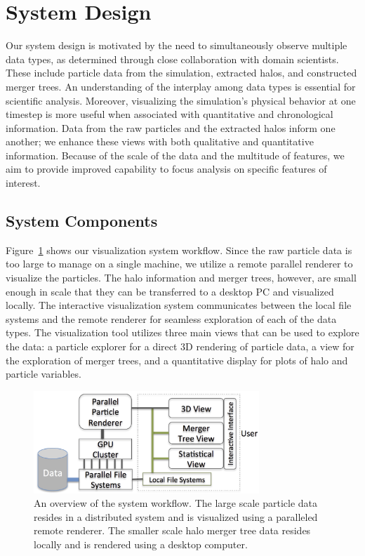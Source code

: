 \section{System Design}
 Our system design is motivated by the need to simultaneously observe multiple data types, as determined through close collaboration with domain scientists. These include particle data from the simulation, extracted halos, and constructed merger trees. An understanding of the interplay among data types is essential for scientific analysis. Moreover, visualizing the simulation's physical behavior at one timestep is more useful when associated with quantitative and chronological information. Data from the raw particles and the extracted halos inform one another; we enhance these views with both qualitative and quantitative information. Because of the scale of the data and the multitude of features, we aim to provide improved capability to focus analysis on specific features of interest. 

\subsection{System Components}
Figure~\ref{fig:system} shows our visualization system workflow. Since the raw particle data is too large to manage on a single machine, we utilize a remote parallel renderer to visualize the particles. The halo information and merger trees, however, are small enough in scale that they can be transferred to a desktop PC and visualized locally. The interactive visualization system communicates between the local file systems and the remote renderer for seamless exploration of each of the data types. The visualization tool utilizes three main views that can be used to explore the data: a particle explorer for a direct 3D rendering of particle data, a view for the exploration of merger trees, and a quantitative display for plots of halo and particle variables.

	\begin{figure}[t]
		\includegraphics[width=8.5cm]{images/darkmatter/CosmoVis.jpg}
		\centering
		\caption{An overview of the system workflow. The large scale particle data resides in a distributed system and is visualized using a paralleled remote renderer. The smaller scale halo merger tree data resides locally and is rendered using a desktop computer.}
		\label{fig:system}
	\end{figure}

